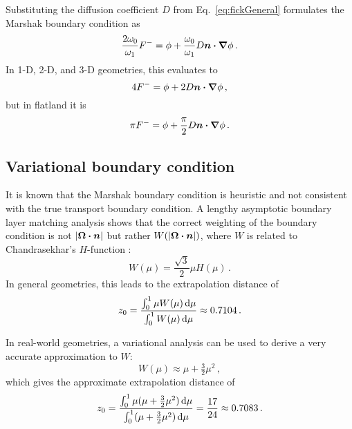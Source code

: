 Substituting the diffusion coefficient $D$ from Eq.~\eqref{eq:fickGeneral}
formulates the Marshak boundary condition as
\begin{equation*}
\frac{2\omega_0}{\omega_1} F^{-}
= \phi + \frac{\omega_0}{\omega_1} D \bm{n} \bm{\cdot} \bm{\nabla} \phi\,.
\end{equation*}
In 1-D, 2-D, and 3-D geometries, this evaluates to
\begin{equation*}
4 F^{-}
= \phi + 2 D \bm{n} \bm{\cdot} \bm{\nabla} \phi\,,
\end{equation*}
but in flatland it is
\begin{equation}\label{eq:flatlandDiffusionMarshak}
\pi F^{-}
= \phi + \frac{\pi}{2} D \bm{n} \bm{\cdot} \bm{\nabla} \phi\,.
\end{equation}

\subsection{Variational boundary condition} \label{sec:varBndy}
It is known that the Marshak boundary condition is heuristic and not consistent with the
true transport boundary condition. A lengthy asymptotic boundary layer
matching analysis \cite{Hab1975} shows that the correct weighting of the
boundary condition is not $\left| \bm{\Omega}\bm{\cdot}\bm{n} \right|$ but rather
$W(\left| \bm{\Omega}\bm{\cdot}\bm{n} \right|)$, where $W$ is related to Chandrasekhar's
$H$-function \cite{Cha1960}:
\begin{equation} \label{eq:chandraW}
  W(\mu) = \frac{\sqrt{3}}{2} \mu H(\mu) \,.
\end{equation}
In general geometries, this leads to the extrapolation distance of
\begin{align*}
  z_0 = \frac{\int_{0}^{1} \mu W(\mu) \mathop{}\!\mathrm{d} \mu}{\int_{0}^{1} W(\mu) \mathop{}\!\mathrm{d}
  \mu} \approx 0.7104\,.
\end{align*}

In real-world geometries, a variational analysis \cite{Mal1991} can be used to
derive a very accurate approximation to $W$:
\begin{equation*}
W(\mu) \approx \mu + \tfrac{3}{2} \mu^2 \,,
\end{equation*}
which gives the approximate extrapolation distance of
\begin{equation*}
  z_0 = \frac{\int_{0}^{1} \mu (\mu + \tfrac{3}{2} \mu^2 ) \mathop{}\!\mathrm{d}
  \mu}{\int_{0}^{1} (\mu + \tfrac{3}{2} \mu^2 ) \mathop{}\!\mathrm{d} \mu} 
  = \frac{17}{24} \approx 0.7083 \,.
\end{equation*}

